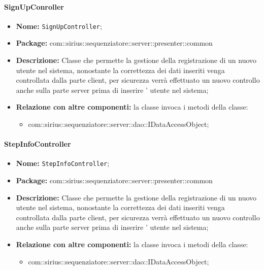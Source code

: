 \paragraph{SignUpConroller}
	\begin{itemize}
		\item \textbf{Nome:} \texttt{SignUpController};
		\item \textbf{Package:} com::sirius::sequenziatore::server::presenter::common
		\item \textbf{Descrizione:} Classe che permette la gestione della registrazione di un nuovo utente nel sistema, nonostante la correttezza dei dati inseriti venga controllata dalla parte client, per sicurezza verrà effettuato un nuovo controllo anche sulla parte server prima di inserire ' utente nel sistema;
		\item \textbf{Relazione con altre componenti:} la classe invoca i metodi della classe:
		\begin{itemize}
			\item com::sirius::sequenziatore::server::dao::IDataAccessObject;
		\end{itemize}
	\end{itemize}
	
\paragraph{StepInfoController}
	\begin{itemize}
		\item \textbf{Nome:} \texttt{StepInfoController};
		\item \textbf{Package:} com::sirius::sequenziatore::server::presenter::common
		\item \textbf{Descrizione:} Classe che permette la gestione della registrazione di un nuovo utente nel sistema, nonostante la correttezza dei dati inseriti venga controllata dalla parte client, per sicurezza verrà effettuato un nuovo controllo anche sulla parte server prima di inserire ' utente nel sistema;
		\item \textbf{Relazione con altre componenti:} la classe invoca i metodi della classe:
		\begin{itemize}
			\item com::sirius::sequenziatore::server::dao::IDataAccessObject;
		\end{itemize}
	\end{itemize}
